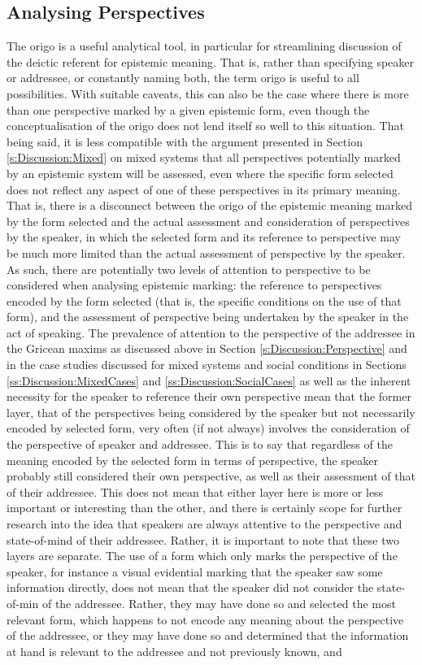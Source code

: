 \subsection{Analysing Perspectives}
The origo is a useful analytical tool, in particular for streamlining discussion of the deictic referent for epistemic meaning. That is, rather than specifying speaker or addressee, or constantly naming both, the term origo is useful to all possibilities. With suitable caveats, this can also be the case where there is more than one perspective marked by a given epistemic form, even though the conceptualisation of the origo does not lend itself so well to this situation. That being said, it is less compatible with the argument presented in Section \ref{s:Discussion:Mixed} on mixed systems that all perspectives potentially marked by an epistemic system will be assessed, even where the specific form selected does not reflect any aspect of one of these perspectives in its primary meaning. That is, there is a disconnect between the origo of the epistemic meaning marked by the form selected and the actual assessment and consideration of perspectives by the speaker, in which the selected form and its reference to perspective may be much more limited than the actual assessment of perspective by the speaker. As such, there are potentially two levels of attention to perspective to be considered when analysing epistemic marking: the reference to perspectives encoded by the form selected (that is, the specific conditions on the use of that form), and the assessment of perspective being undertaken by the speaker in the act of speaking. The prevalence of attention to the perspective of the addressee in the Gricean maxims as discussed above in Section \ref{s:Discussion:Perspective} and in the case studies discussed for mixed systems and social conditions in Sections \ref{ss:Discussion:MixedCases} and \ref{ss:Discussion:SocialCases} as well as the inherent necessity for the speaker to reference their own perspective mean that the former layer, that of the perspectives being considered by the speaker but not necessarily encoded by selected form, very often (if not always) involves the consideration of the perspective of speaker and addressee. This is to say that regardless of the meaning encoded by the selected form in terms of perspective, the speaker probably still considered their own perspective, as well as their assessment of that of their addressee. This does not mean that either layer here is more or less important or interesting than the other, and there is certainly scope for further research into the idea that speakers are always attentive to the perspective and state-of-mind of their addressee. Rather, it is important to note that these two layers are separate. The use of a form which only marks the perspective of the speaker, for instance a visual evidential marking that the speaker saw some information directly, does not mean that the speaker did not consider the state-of-min of the addressee. Rather, they may have done so and selected the most relevant form, which happens to not encode any meaning about the perspective of the addressee, or they may have done so and determined that the information at hand is relevant to the addressee and not previously known, and 